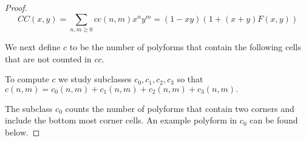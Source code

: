 \documentclass[12pt]{article}
\theoremstyle{plain}
\theoremstyle{definition}
\theoremstyle{remark}
\theoremstyle{definition}
\newcommand{\cellw}[4]{\draw[thick] ( #1 , #2 ) rectangle ( #3 , #4 );}
\newcommand{\cellb}[4]{\filldraw[black!60] ( #1 , #2 ) rectangle ( #3 , #4 ); \draw[thick] ( #1 , #2 ) rectangle ( #3 , #4 );}
\begin{document}
\begin{proof}
$$CC(x,y)=\sum_{n,m\geq 0}cc(n,m)x^n y^m = (1-xy)(1+(x+y)F(x,y))$$

We next define $c$ to be the number of polyforms that contain the following cells that are not counted in $cc$.

\begin{center}
\end{center}

To compute $c$ we study subclasses $c_0,c_1,c_2,c_3$ so that $c(n,m)=c_0(n,m)+c_1(n,m)+c_2(n,m)+c_3(n,m).$

The subclass $c_0$ counts the number of polyforms that contain two corners and include the bottom most corner cells. An example polyform in $c_0$ can be found below. 


\end{proof}
\end{document}
